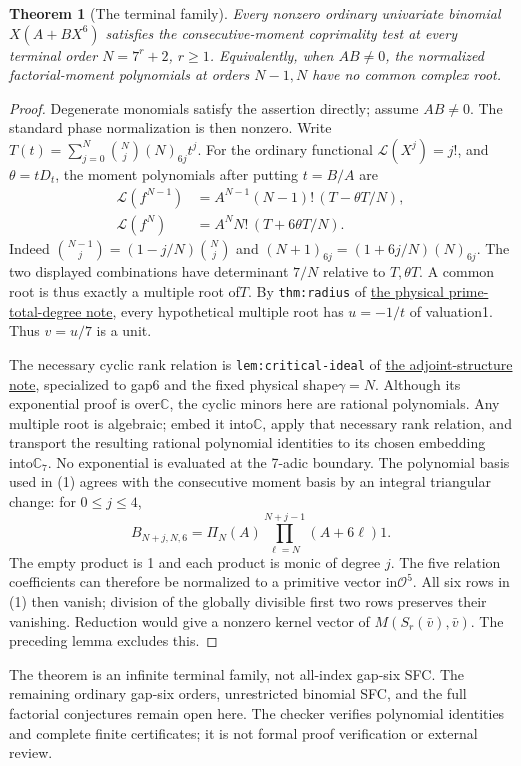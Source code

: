 \documentclass[11pt]{article}
\newtheorem{theorem}[lemma]{Theorem}
\begin{document}
\begin{theorem}[The terminal family]\label{thm:family}
Every nonzero ordinary univariate binomial $X(A+BX^6)$ satisfies the
consecutive-moment coprimality test at every terminal order
$N=7^r+2$, $r\ge1$.
Equivalently, when $AB\ne0$, the normalized factorial-moment
polynomials at orders $N-1,N$ have no common complex root.
\end{theorem}
\begin{proof}
Degenerate monomials satisfy the assertion directly; assume $AB\ne0$.
The standard phase normalization is then nonzero.
Write
$T(t)=\sum_{j=0}^N\binom Nj(N)_{6j}t^j$.
For the ordinary functional $\mathcal L(X^j)=j!$, and
$\theta=tD_t$, the moment polynomials after putting $t=B/A$ are
\[
 \begin{split}
 \mathcal L(f^{N-1})&=A^{N-1}(N-1)!\,(T-\theta T/N),\\
 \mathcal L(f^N)&=A^NN!\,(T+6\theta T/N).
 \end{split}
\]
Indeed $\binom{N-1}{j}=(1-j/N)\binom Nj$ and
$(N+1)_{6j}=(1+6j/N)(N)_{6j}$.
The two displayed combinations have determinant $7/N$ relative
to $T,\theta T$.
A common root is thus exactly a multiple root of$T$.
By \texttt{thm:radius} of
\href{PHYSICAL_PRIME_TOTAL_DEGREE_REDUCTION.tex}
{the physical prime-total-degree note},
every hypothetical multiple root has $u=-1/t$ of valuation1.
Thus $v=u/7$ is a unit.

The necessary cyclic rank relation is
\texttt{lem:critical-ideal} of
\href{gap_three_hurwitz_structure.tex}
{the adjoint-structure note}, specialized to gap6 and
the fixed physical shape$\gamma=N$.
Although its exponential proof is over$\mathbb C$, the cyclic
minors here are rational polynomials. Any multiple root is
algebraic; embed it into$\mathbb C$, apply that necessary rank
relation, and transport the resulting rational polynomial
identities to its chosen embedding into$\mathbb C_7$.
No exponential is evaluated at the 7-adic boundary.
The polynomial basis used in (1) agrees with the consecutive
moment basis by an integral triangular change: for $0\le j\le4$,
\[
 B_{N+j,N,6}
 =\Pi_N(A)\prod_{\ell=N}^{N+j-1}(A+6\ell)1 .
\]
The empty product is 1 and each product is monic of degree $j$.
The five relation coefficients can therefore be normalized to a
primitive vector in$\mathcal O^5$.
All six rows in (1) then vanish; division of the globally divisible
first two rows preserves their vanishing.
Reduction would give a nonzero kernel vector of
$M(S_r(\bar v),\bar v)$.
The preceding lemma excludes this.
\end{proof}

The theorem is an infinite terminal family, not all-index gap-six
SFC. The remaining ordinary gap-six orders, unrestricted binomial
SFC, and the full factorial conjectures remain open here.
The checker verifies polynomial identities and complete finite
certificates; it is not formal proof verification or external review.
\end{document}
